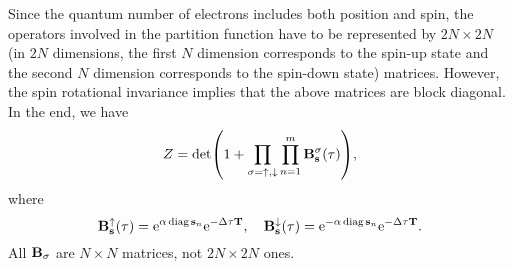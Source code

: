 \documentclass[hyperref, a4paper]{article}
\DeclareMathOperator{\diag}{diag}
\newcommand*{\ee}{\mathrm{e}}
\begin{document}
Since the quantum number of electrons includes both position and spin, the operators involved in the partition function have to be represented by $2N \times 2N$ (in $2N$ dimensions, the first $N$ dimension corresponds to the spin-up state and the second $N$ dimension corresponds to the spin-down state) matrices.
However, the spin rotational invariance implies that the above matrices are block diagonal.
In the end, we have 
\begin{equation}
    Z = \det(1 + \prod_{\sigma=\uparrow, \downarrow} \prod_{n=1}^m \vb{B}_{\vb{s}}^\sigma(\tau) ),
\end{equation}
where
\begin{equation}
    \vb{B}^\uparrow_{\vb{s}}(\tau) = \ee^{\alpha \diag \vb{s}_n} \ee^{- \Delta \tau \vb{T}}, \quad \vb{B}^\downarrow_{\vb{s}}(\tau) = \ee^{- \alpha \diag \vb{s}_n} \ee^{- \Delta \tau \vb{T}}.
\end{equation}
All $\vb{B}_{\sigma}$ are $N \times N$ matrices, not $2N \times 2N$ ones.
\end{document}
